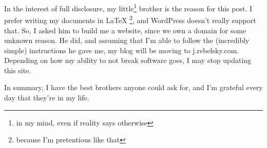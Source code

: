 \documentclass[12pt]{article}[titlepage]
\newcommand{\1}{\={a}}
\newcommand{\2}{\={e}}
\newcommand{\3}{\={\i}}
\newcommand{\4}{\=o}
\newcommand{\5}{\=u}
\newcommand{\6}{\={A}}
\renewcommand{\,}{\textsuperscript{,}}
\begin{document}
In the interest of full disclosure, my little\footnote{in my mind, even if reality says otherwise} brother is the reason for this post. I prefer writing my documents in LaTeX \footnote{because I'm pretentious like that}, and WordPress doesn't really support that. So, I asked him to build me a website, since we own a domain for some unknown reason. He did, and assuming that I'm able to follow the (incredibly simple) instructions he gave me, my blog will be moving to j.rebelsky.com. Depending on how my ability to not break software goes, I may stop updating this site.

In summary, I have the best brothers anyone could ask for, and I'm grateful every day that they're in my life.
\end{document}
